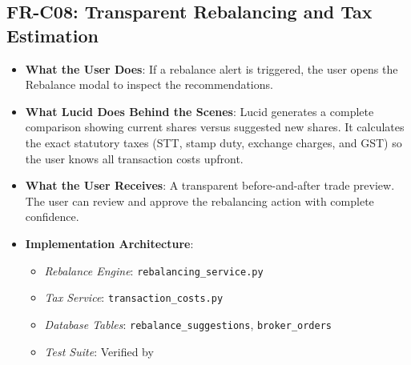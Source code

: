 \subsection{FR-C08: Transparent Rebalancing and Tax Estimation}
\begin{itemize}
    \item \textbf{What the User Does}: If a rebalance alert is triggered, the user opens the Rebalance modal to inspect the recommendations.
    \item \textbf{What Lucid Does Behind the Scenes}: Lucid generates a complete comparison showing current shares versus suggested new shares. It calculates the exact statutory taxes (STT, stamp duty, exchange charges, and GST) so the user knows all transaction costs upfront.
    \item \textbf{What the User Receives}: A transparent before-and-after trade preview. The user can review and approve the rebalancing action with complete confidence.
    \item \textbf{Implementation Architecture}:
    \begin{itemize}
        \item \textit{Rebalance Engine}: \texttt{rebalancing\_service.py}
        \item \textit{Tax Service}: \texttt{transaction\_costs.py}
        \item \textit{Database Tables}: \texttt{rebalance\_suggestions}, \texttt{broker\_orders}
        \item \textit{Test Suite}: Verified by 
    \end{itemize}
\end{itemize}

